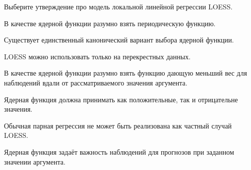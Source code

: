 
\begin{question}
Выберите утверждение про модель локальной линейной регрессии LOESS.
\begin{answerlist}
  \item В качестве ядерной функции разумно взять периодическую функцию.
  \item Существует единственный канонический вариант выбора ядерной функции.
  \item LOESS можно использовать только на перекрестных данных.
  \item В качестве ядерной функции разумно взять функцию дающую меньший вес для наблюдений вдали от рассматриваемого значения аргумента.
  \item Ядерная функция должна принимать как положительные, так и отрицательне значения.
  \item Обычная парная регрессия не может быть реализована как частный случай LOESS.
\end{answerlist}
\end{question}

\begin{solution}
Ядерная функция задаёт важность наблюдений для прогнозов при заданном значении аргумента.
\end{solution}

